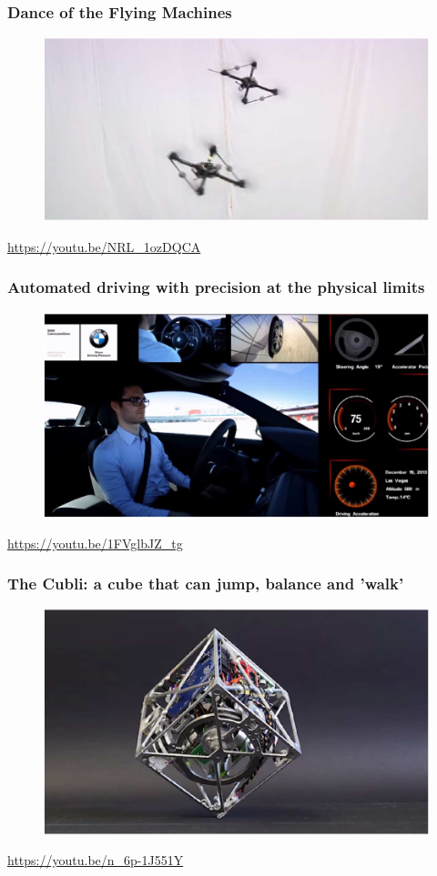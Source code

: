 \documentclass{beamer}
\begin{document}
\begin{frame}
\frametitle{Dance of the Flying Machines}
\begin{figure}
\includegraphics[scale=.7]{flying_machines}
\end{figure}
\url{https://youtu.be/NRL_1ozDQCA}
\end{frame}


\begin{frame}
\frametitle{Automated driving with precision at the physical limits}
\begin{figure}
\includegraphics[scale=.7]{autonomous_car}
\end{figure}
\url{https://youtu.be/1FVglbJZ_tg}
\end{frame}


\begin{frame}
\frametitle{The Cubli: a cube that can jump, balance and 'walk'}
\begin{figure}
\includegraphics[scale=.7]{cubli}
\end{figure}
\url{https://youtu.be/n_6p-1J551Y}
\end{frame}
\end{document}
